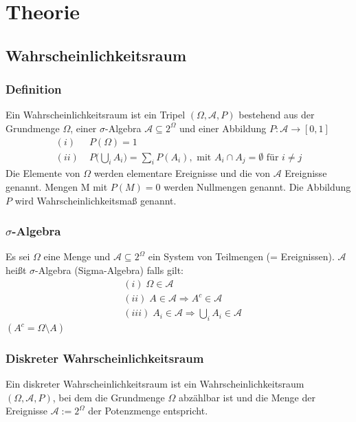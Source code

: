 \documentclass[a4paper]{article}
\begin{document}
\section{Theorie}
\setlength{\parindent}{0em}

\subsection{Wahrscheinlichkeitsraum}

\subsubsection{Definition}
Ein Wahrscheinlichkeitsraum ist ein Tripel $(\Omega, \mathcal{A}, P)$ bestehend aus der Grundmenge $\Omega$, einer $\sigma$-Algebra $\mathcal{A} \subseteq  2^{\Omega}$ und einer Abbildung
$P : \mathcal{A} \to [0,1]$
\begin{align*}
(i) & \; P(\Omega) = 1 \\
(ii) & \;  P \biggl(  \bigcup_i A_i  \biggr) = \sum_i P(A_i), \text{ mit } A_i \cap A_j = \emptyset \text{ für } i \neq j
\end{align*}
Die Elemente von $\Omega$ werden elementare Ereignisse und die von $\mathcal{A}$ Ereignisse genannt. Mengen M mit $P(M) = 0$ werden Nullmengen genannt.
Die Abbildung $P$ wird Wahrscheinlichkeitsmaß genannt.

\subsubsection{$\sigma$-Algebra}
Es sei $\Omega$ eine Menge und $\mathcal{A} \subseteq  2^{\Omega}$ ein System von Teilmengen (= Ereignissen). $\mathcal{A}$ heißt $\sigma$-Algebra (Sigma-Algebra) falls gilt:
\begin{align*}
& (i) \; \Omega \in \mathcal{A} \\
& (ii) \; A \in \mathcal{A} \Rightarrow A^c \in \mathcal{A} \\
& (iii) \; A_i \in \mathcal{A} \Rightarrow \bigcup_i A_i \in \mathcal{A} 
\end{align*}
$(A^c = \Omega \setminus A)$

\subsubsection{Diskreter Wahrscheinlichkeitsraum}
Ein diskreter Wahrscheinlichkeitsraum ist ein Wahrscheinlichkeitsraum $(\Omega, \mathcal{A}, P)$, bei dem die Grundmenge $\Omega$ abzählbar ist und die Menge der Ereignisse $\mathcal{A} := 2^{\Omega}$ der Potenzmenge entspricht.
\end{document}
